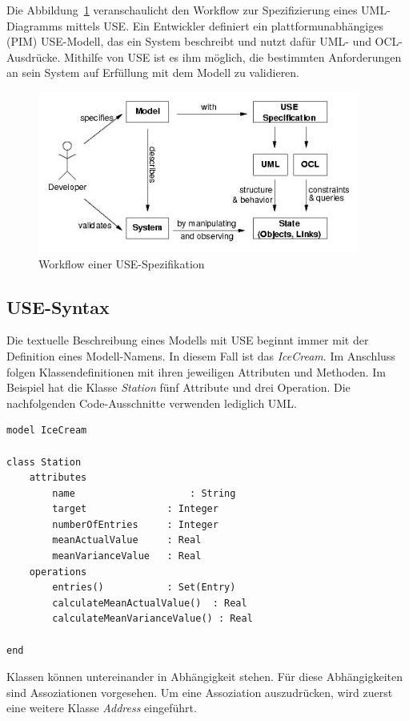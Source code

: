 \documentclass[a4paper,twoside]{article}
\begin{document}
Die Abbildung~\ref{fig:Grafik1} veranschaulicht den Workflow zur Spezifizierung eines UML-Diagramms mittels USE. Ein Entwickler definiert ein plattformunabhängiges (PIM) USE-Modell, das ein System beschreibt und nutzt dafür UML- und OCL-Ausdrücke. Mithilfe von USE ist es ihm möglich, die bestimmten Anforderungen an sein System auf Erfüllung mit dem Modell zu validieren.

\begin{figure}[!h]
	\includegraphics[scale=.7]{pics/USE_workflow.jpg}
	\caption{Workflow einer USE-Spezifikation \cite{Data07}}
	\label{fig:Grafik1}
\end{figure}

\subsection{USE-Syntax} 
\label{ssec:specification}

Die textuelle Beschreibung eines Modells mit USE beginnt immer mit der Definition eines Modell-Namens. In diesem Fall ist das \textit{IceCream}. Im Anschluss folgen Klassendefinitionen mit ihren jeweiligen Attributen und Methoden. Im Beispiel hat die Klasse \textit{Station} fünf Attribute und drei Operation. Die nachfolgenden Code-Ausschnitte verwenden lediglich UML.

\lstset{basicstyle=\tiny,style=myCustomUseStyle}
\begin{lstlisting}[caption={USE-Spezifikation der Klasse Station im Modell IceCream},label=lst:use1]
model IceCream

class Station
	attributes
		name					: String
		target				: Integer
		numberOfEntries 	: Integer
		meanActualValue 	: Real 
		meanVarianceValue	: Real
	operations
		entries()			: Set(Entry) 
		calculateMeanActualValue()	: Real
		calculateMeanVarianceValue() : Real
		
end
\end{lstlisting}

Klassen können untereinander in Abhängigkeit stehen. Für diese Abhängigkeiten sind Assoziationen vorgesehen. Um eine Assoziation auszudrücken, wird zuerst eine weitere Klasse \textit{Address} eingeführt.
\end{document}
